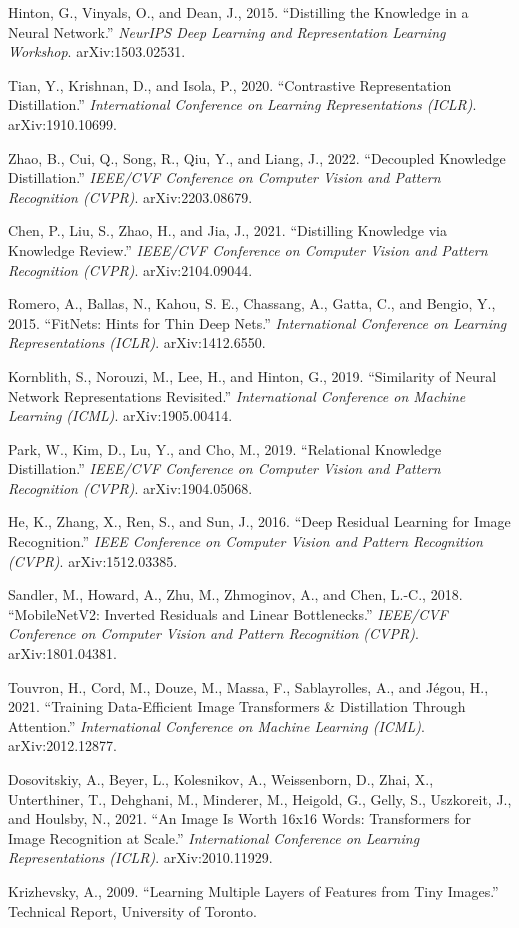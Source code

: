 \documentclass[11pt, letterpaper]{article}
\begin{document}
\begin{enumerate}[label={[\arabic*]},leftmargin=*]
  \item Hinton, G., Vinyals, O., and Dean, J., 2015. ``Distilling the Knowledge in a Neural Network.'' \textit{NeurIPS Deep Learning and Representation Learning Workshop}. arXiv:1503.02531.
  \item Tian, Y., Krishnan, D., and Isola, P., 2020. ``Contrastive Representation Distillation.'' \textit{International Conference on Learning Representations (ICLR)}. arXiv:1910.10699.
  \item Zhao, B., Cui, Q., Song, R., Qiu, Y., and Liang, J., 2022. ``Decoupled Knowledge Distillation.'' \textit{IEEE/CVF Conference on Computer Vision and Pattern Recognition (CVPR)}. arXiv:2203.08679.
  \item Chen, P., Liu, S., Zhao, H., and Jia, J., 2021. ``Distilling Knowledge via Knowledge Review.'' \textit{IEEE/CVF Conference on Computer Vision and Pattern Recognition (CVPR)}. arXiv:2104.09044.
  \item Romero, A., Ballas, N., Kahou, S. E., Chassang, A., Gatta, C., and Bengio, Y., 2015. ``FitNets: Hints for Thin Deep Nets.'' \textit{International Conference on Learning Representations (ICLR)}. arXiv:1412.6550.
  \item Kornblith, S., Norouzi, M., Lee, H., and Hinton, G., 2019. ``Similarity of Neural Network Representations Revisited.'' \textit{International Conference on Machine Learning (ICML)}. arXiv:1905.00414.
  \item Park, W., Kim, D., Lu, Y., and Cho, M., 2019. ``Relational Knowledge Distillation.'' \textit{IEEE/CVF Conference on Computer Vision and Pattern Recognition (CVPR)}. arXiv:1904.05068.
  \item He, K., Zhang, X., Ren, S., and Sun, J., 2016. ``Deep Residual Learning for Image Recognition.'' \textit{IEEE Conference on Computer Vision and Pattern Recognition (CVPR)}. arXiv:1512.03385.
  \item Sandler, M., Howard, A., Zhu, M., Zhmoginov, A., and Chen, L.-C., 2018. ``MobileNetV2: Inverted Residuals and Linear Bottlenecks.'' \textit{IEEE/CVF Conference on Computer Vision and Pattern Recognition (CVPR)}. arXiv:1801.04381.
  \item Touvron, H., Cord, M., Douze, M., Massa, F., Sablayrolles, A., and J\'egou, H., 2021. ``Training Data-Efficient Image Transformers \& Distillation Through Attention.'' \textit{International Conference on Machine Learning (ICML)}. arXiv:2012.12877.
  \item Dosovitskiy, A., Beyer, L., Kolesnikov, A., Weissenborn, D., Zhai, X., Unterthiner, T., Dehghani, M., Minderer, M., Heigold, G., Gelly, S., Uszkoreit, J., and Houlsby, N., 2021. ``An Image Is Worth 16x16 Words: Transformers for Image Recognition at Scale.'' \textit{International Conference on Learning Representations (ICLR)}. arXiv:2010.11929.
  \item Krizhevsky, A., 2009. ``Learning Multiple Layers of Features from Tiny Images.'' Technical Report, University of Toronto.
\end{enumerate}
\end{document}
